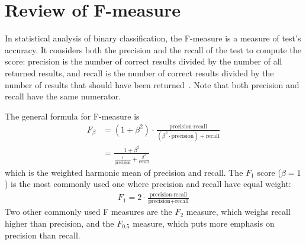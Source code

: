 \chapter{Review of F-measure}\label{app:fmeasure}
In statistical analysis of binary classification, the F-measure is a measure of
test's accuracy. It considers both the precision and the recall of the test
to compute the score: precision is the number of correct results divided by
the number of all returned results, and recall is the number of correct
results divided by the number of results that should have been
returned~\cite{f1score14}. Note that both precision and recall have the same
numerator.

The general formula for F-measure is
\begin{align*}
F_\beta &= (1 + \beta^2)\cdot\frac{\text{precision}\cdot
\text{recall}}{(\beta^2\cdot\text{precision}) + \text{recall}}\\
&= \frac{1 + \beta^2}{\frac{1}{\text{precision}}+\frac{\beta^2}{\text{recall}}}
\end{align*}
which is the weighted harmonic mean of precision and recall. The $F_1$ score
($\beta=1$) is the most commonly used one where precision and recall have
equal weight:
\begin{align*}
F_1 = 2\cdot\frac{\text{precision}\cdot
\text{recall}}{\text{precision} + \text{recall}}
\end{align*}
Two other commonly used F measures are the $F_2$ measure, which weighs recall
higher than precision, and the $F_{0.5}$ measure, which puts more emphasis on
precision than recall.

